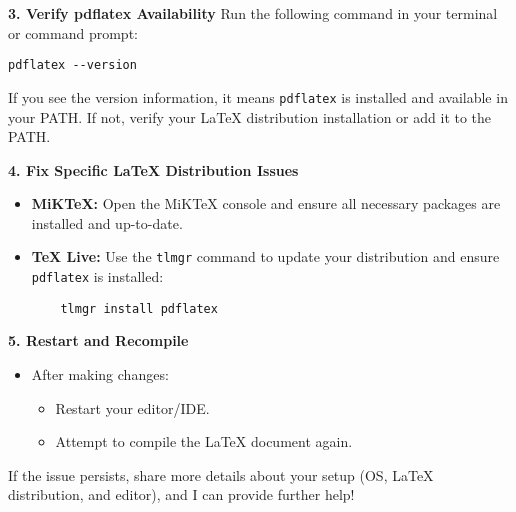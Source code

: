 \begin{enumerate}
\textbf{3. Verify pdflatex Availability}
Run the following command in your terminal or command prompt:
\begin{verbatim}
pdflatex --version
\end{verbatim}
If you see the version information, it means \texttt{pdflatex} is installed and available in your PATH. If not, verify your LaTeX distribution installation or add it to the PATH.

\textbf{4. Fix Specific LaTeX Distribution Issues}
\begin{itemize}
    \item \textbf{MiKTeX:} Open the MiKTeX console and ensure all necessary packages are installed and up-to-date.
    \item \textbf{TeX Live:} Use the \texttt{tlmgr} command to update your distribution and ensure \texttt{pdflatex} is installed:
    \begin{verbatim}
    tlmgr install pdflatex
    \end{verbatim}
\end{itemize}

\textbf{5. Restart and Recompile}
\begin{itemize}
    \item After making changes:
    \begin{itemize}
        \item Restart your editor/IDE.
        \item Attempt to compile the LaTeX document again.
    \end{itemize}
\end{itemize}

If the issue persists, share more details about your setup (OS, LaTeX distribution, and editor), and I can provide further help!
    
\end{enumerate}